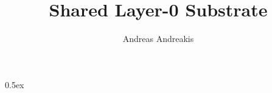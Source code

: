 \documentclass[11pt,a4paper]{article}
\begin{document}
\title{Shared Layer-0 Substrate}
\author{Andreas Andreakis}
\maketitle

\tableofcontents

\parindent 0pt\parskip 0.5ex


\nocite{dual-write-recovery-paper}


\end{document}
